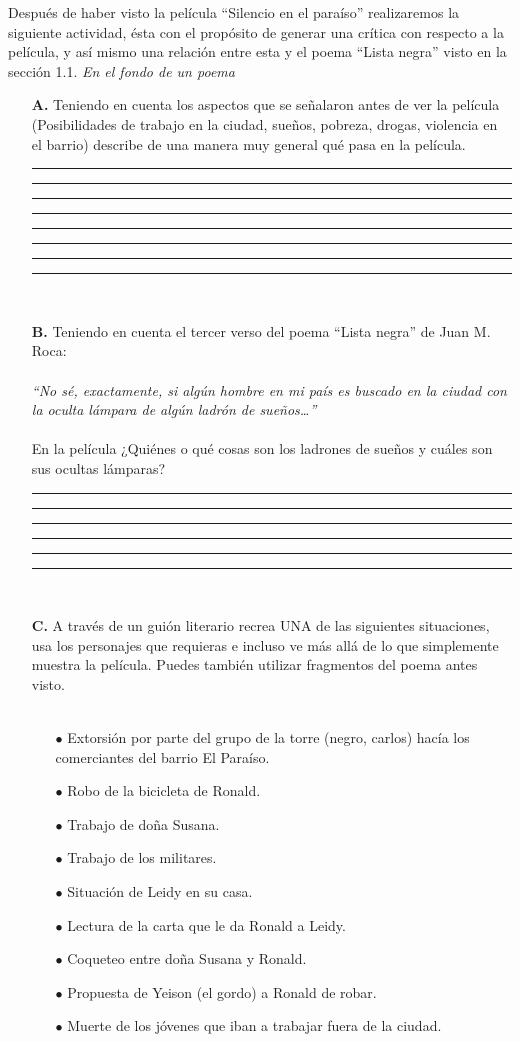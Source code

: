 \documentclass[11pt,fleqn,twocolumn]{book} %
\begin{document}
\begin{exercise}
Después de haber visto la película “Silencio en el paraíso” realizaremos la siguiente actividad, ésta con el propósito de generar una crítica con respecto a la película,  y así mismo una relación entre esta y el poema “Lista negra” visto en la sección 1.1. \textit{En el fondo de un poema} \\
\begin{itemize}
\item[\textbf{A.}] Teniendo en cuenta los aspectos que se señalaron antes de ver la película (Posibilidades de trabajo en la ciudad, sueños, pobreza, drogas, violencia en el barrio) describe de una manera muy general qué pasa en la película.
\rule[-0.2mm]{64mm}{0.1mm}
\rule[-0.2mm]{64mm}{0.1mm}
\rule[-0.2mm]{64mm}{0.1mm}
\rule[-0.2mm]{64mm}{0.1mm}
\rule[-0.2mm]{64mm}{0.1mm}
\rule[-0.2mm]{64mm}{0.1mm}
\rule[-0.2mm]{64mm}{0.1mm}
\rule[-0.2mm]{64mm}{0.1mm} \\
\item[\textbf{B.}] Teniendo en cuenta el tercer verso del poema “Lista negra” de Juan M. Roca:\\\\
\textit{“No sé, exactamente, si algún hombre en mi país es buscado en la ciudad con la oculta lámpara de algún ladrón de sueños…”}
\\\\
En la película ¿Quiénes o qué cosas son los ladrones de sueños y cuáles son sus ocultas lámparas? \\
\rule[-0.2mm]{64mm}{0.1mm}
\rule[-0.2mm]{64mm}{0.1mm}
\rule[-0.2mm]{64mm}{0.1mm}
\rule[-0.2mm]{64mm}{0.1mm}
\rule[-0.2mm]{64mm}{0.1mm}
\rule[-0.2mm]{64mm}{0.1mm} \\
\item[\textbf{C.}] A través de un guión literario recrea UNA de las siguientes situaciones, usa los personajes que requieras e incluso ve más allá de lo que simplemente muestra la película. Puedes también utilizar fragmentos del poema antes visto. \\\\
\begin{itemize}
\item[$\bullet$] Extorsión por parte del grupo de la torre (negro, carlos) hacía los comerciantes del barrio El Paraíso.
\item[$\bullet$] Robo de la bicicleta de Ronald.
\item[$\bullet$] Trabajo de doña Susana.
\item[$\bullet$] Trabajo de los militares.
\item[$\bullet$] Situación de Leidy en su casa.
\item[$\bullet$] Lectura de la carta que le da Ronald a Leidy.
\item[$\bullet$] Coqueteo entre doña Susana y Ronald.
\item[$\bullet$] Propuesta de Yeison (el gordo) a Ronald de robar.
\item[$\bullet$] Muerte de los jóvenes que iban a trabajar fuera de la ciudad.


\end{itemize}
\end{itemize}
\end{exercise}
\end{document}
